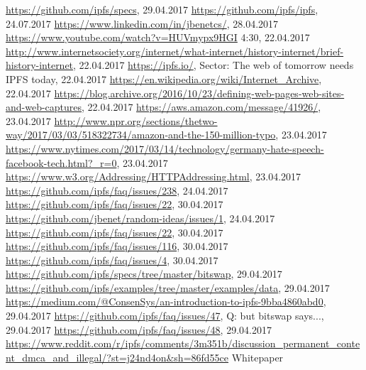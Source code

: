\documentclass[a4paper,11pt, oneside]{report}
\theoremstyle{definition}
\begin{document}
\begin{thebibliography}{1}
 \url{https://github.com/ipfs/specs}, 29.04.2017
 \url{https://github.com/ipfs/ipfs}, 24.07.2017
 \url{https://www.linkedin.com/in/jbenetcs/}, 28.04.2017
 \url{https://www.youtube.com/watch?v=HUVmypx9HGI} 4:30, 22.04.2017
 \url{http://www.internetsociety.org/internet/what-internet/history-internet/brief-history-internet}, 22.04.2017
 \url{https://ipfs.io/}, Sector: The web of tomorrow needs IPFS today, 22.04.2017
 \url{https://en.wikipedia.org/wiki/Internet_Archive}, 22.04.2017
 \url{https://blog.archive.org/2016/10/23/defining-web-pages-web-sites-and-web-captures}, 22.04.2017
 \url{https://aws.amazon.com/message/41926/}, 23.04.2017
 \url{http://www.npr.org/sections/thetwo-way/2017/03/03/518322734/amazon-and-the-150-million-typo}, 23.04.2017
 \url{https://www.nytimes.com/2017/03/14/technology/germany-hate-speech-facebook-tech.html?_r=0}, 23.04.2017
 \url{https://www.w3.org/Addressing/HTTPAddressing.html}, 23.04.2017 
\url{https://github.com/ipfs/faq/issues/238}, 24.04.2017
 \url{https://github.com/ipfs/faq/issues/22}, 30.04.2017
 \url{https://github.com/jbenet/random-ideas/issues/1}, 24.04.2017
 \url{https://github.com/ipfs/faq/issues/22}, 30.04.2017
 \url{https://github.com/ipfs/faq/issues/116}, 30.04.2017
 \url{https://github.com/ipfs/faq/issues/4}, 30.04.2017
 \url{https://github.com/ipfs/specs/tree/master/bitswap}, 29.04.2017
 \url{https://github.com/ipfs/examples/tree/master/examples/data}, 29.04.2017
 \url{https://medium.com/@ConsenSys/an-introduction-to-ipfs-9bba4860abd0}, 29.04.2017
 \url{https://github.com/ipfs/faq/issues/47}, Q: but bitswap says..., 29.04.2017
 \url{https://github.com/ipfs/faq/issues/48}, 29.04.2017
\url{https://www.reddit.com/r/ipfs/comments/3m351b/discussion_permanent_content_dmca_and_illegal/?st=j24nd4on&sh=86fd55ce}
 Whitepaper
 
\end{thebibliography}


\printglossaries

\listoffigures
\end{document}
